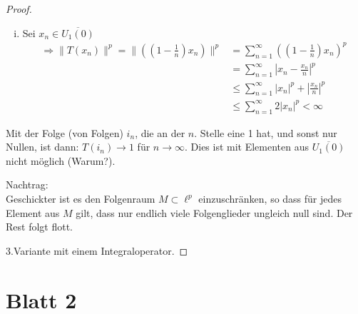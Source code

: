 \documentclass[ngerman]{article}
\theoremstyle{definition}%
\newcommand{\df}{\Rightarrow} %
\renewcommand{\{ }{\left\lbrace}
\renewcommand{\}}{\right\rbrace}
\begin{document}
\begin{enumerate}[(a)]
\begin{proof}
\begin{enumerate}[(i)]
\item Sei $x_n \in \overline{U_1(0)}$
\begin{equation*}
\begin{split}
 \df 
 \|T(x_n)\|^p 
 = \|\left(\left(1-\frac{1}{n}\right)x_n\right)\|^p 
 & = \sum^\infty_{n=1} \left(\left(1-\frac{1}{n}\right)x_n\right)^p 
 \\ & = \sum^\infty_{n=1} | x_n-\frac{x_n}{n}|^p 
 \\ & \leq \sum^\infty_{n=1} |x_n|^p+|\frac{x_n}{n}|^p
 \\ & \leq \sum^\infty_{n=1} 2|x_n|^p < \infty
 \end{split}
\end{equation*}


\end{enumerate}
Mit der Folge (von Folgen) $i_n$, die an der $n.$ Stelle eine 1 hat, und sonst nur Nullen, ist dann: $T(i_n) \longrightarrow 1$ für $n\longrightarrow \infty$. Dies ist mit Elementen aus $\overline{U_1(0)}$ nicht möglich (Warum?).\par
Nachtrag:\\
Geschickter ist es den Folgenraum $M\subset \ell^p$ einzuschränken, so dass für jedes Element aus $M$ gilt, dass nur endlich viele Folgenglieder ungleich null sind. Der Rest folgt flott.


3.Variante mit einem Integraloperator.
\end{proof}

\end{enumerate}


\newpage
\section{Blatt 2}

\end{document}
